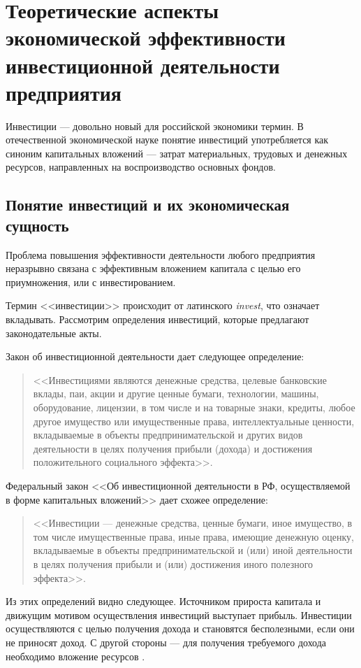 \section{Теоретические аспекты экономической эффективности инвестиционной деятельности предприятия}
Инвестиции --- довольно новый для российской экономики термин. В отечественной экономической науке понятие инвестиций употребляется как синоним капитальных вложений --- затрат материальных, трудовых и денежных ресурсов, направленных на воспроизводство основных фондов.

\subsection{Понятие инвестиций и их экономическая сущность}
Проблема повышения эффективности деятельности любого предприятия неразрывно связана с эффективным вложением капитала с целью его приумножения, или с инвестированием.

Термин <<инвестиции>> происходит от латинского \textit{invest}, что означает вкладывать. Рассмотрим определения инвестиций, которые предлагают законодательные акты.

Закон об инвестиционной деятельности \cite{1488} дает следующее определение:
\begin{quote}
	<<Инвестициями являются денежные средства, целевые банковские вклады, паи, акции и другие ценные бумаги, технологии, машины, оборудование, лицензии, в том числе и на товарные знаки, кредиты, любое другое имущество или имущественные права, интеллектуальные ценности, вкладываемые в объекты предпринимательской и других видов деятельности в целях получения прибыли (дохода) и достижения положительного социального эффекта>>.
\end{quote}

Федеральный закон <<Об инвестиционной деятельности в РФ, осуществляемой в форме капитальных вложений>> \cite{39-fz} дает схожее определение:
\begin{quote}
	<<Инвестиции --- денежные средства, ценные бумаги, иное имущество, в том числе имущественные права, иные права, имеющие денежную оценку, вкладываемые в объекты предпринимательской и (или) иной деятельности в целях получения прибыли и (или) достижения иного полезного эффекта>>.
\end{quote}

Из этих определений видно следующее. Источником прироста капитала и движущим мотивом осуществления инвестиций выступает прибыль. Инвестиции осуществляются с целью получения дохода и становятся бесполезными, если они не приносят доход. С другой стороны --- для получения требуемого дохода необходимо вложение ресурсов \cite[с. 13]{kasyanenko}.


